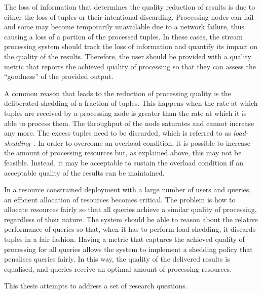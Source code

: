 The loss of information that determines the quality reduction of results is due to either the loss of
tuples or their intentional discarding.
Processing nodes can fail and some may become temporarily unavailable due to a network failure,
thus causing a loss of a portion of the processed tuples. 
In these cases, the stream processing system should track the loss of information and
quantify its impact on the quality of the results. Therefore, the user should be provided with a quality
metric that reports the achieved quality of processing so that they can assess the ``goodness'' of
the provided output.

A common reason that leads to the reduction of processing quality is the deliberated
shedding of a fraction of tuples. This happens when the rate at which tuples are received by a
processing node is greater than the rate at which it is able to process them. The throughput of the node
saturates and cannot increase any more. The excess tuples need
to be discarded, which is referred to as \emph{\mbox{load-shedding}}~\cite{load-shedding}.
In order to overcome an overload condition, it is possible to increase the amount of processing
resources but, as explained above, this may not be feasible. Instead, it may be acceptable to sustain
the overload condition if an acceptable quality of the results can be maintained.

In a resource constrained deployment with a large number of users and queries, an efficient allocation of
resources becomes critical. The problem is how to allocate resources fairly so that all queries achieve
a similar quality of processing, regardless of their nature. The system should be able to reason
about the relative performance of queries so that, when it has to perform \mbox{load-shedding}, it
discards tuples in a fair fashion. Having a metric that captures the achieved quality of processing for
all queries allows the system to implement a shedding policy that penalises queries fairly.
In this way, the quality of the delivered results is equalised, and queries receive an optimal amount of
processing resources.%

This thesis attempts to address a set of research questions.

